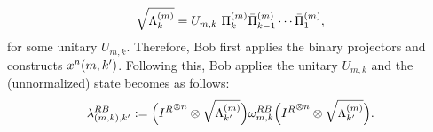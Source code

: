 \begin{align*}
    \sqrt{\Lambda_{k}^{(m)}} = U_{m,k} \ \Pi_{k}^{(m)}\Pibar_{k-1}^{(m)}\cdots \Pibar_{1}^{(m)},
\end{align*}
for some unitary $U_{m,k}$. Therefore, Bob first applies the binary projectors and constructs $x^n(m,k')$. Following this, Bob applies the unitary $U_{m,k}$ and the (unnormalized) state becomes as follows:
\begin{equation}\label{eqn:lambdamk}
    \lambda_{(m,k),k'}^{R B}:=\Big({I^{R}}^{\otimes n}\otimes \sqrt{\Lambda_{k'}^{(m)}}\Big)\omega^{R B}_{m,k}\Big({I^{R}}^{\otimes n}\otimes \sqrt{\Lambda_{k'}^{(m)}}\Big).
\end{equation}
